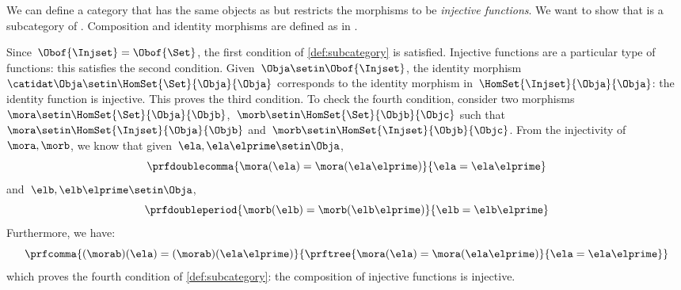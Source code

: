 \begin{example}
    \label{ex:Injset}
    We can define a category \Injset that has the same objects as \Set but restricts the morphisms to be \emph{injective functions}.
    We want to show that \Injset is a subcategory of \Set.
    Composition and identity morphisms are defined as in \Set.

    Since~$\Obof{\Injset}=\Obof{\Set}$, the first condition of \cref{def:subcategory} is satisfied.
    Injective functions are a particular type of functions: this satisfies the second condition.
    Given~$\Obja\setin \Obof{\Injset}$, the identity morphism~$\catidat\Obja\setin \HomSet{\Set}{\Obja}{\Obja}$ corresponds to the identity morphism in~$\HomSet{\Injset}{\Obja}{\Obja}$: the identity function is injective.
    This proves the third condition.
    To check the fourth condition, consider two morphisms~$\mora \setin \HomSet{\Set}{\Obja}{\Objb}$,~$\morb \setin \HomSet{\Set}{\Objb}{\Objc}$ such that~$\mora \setin \HomSet{\Injset}{\Obja}{\Objb}$ and~$\morb\setin \HomSet{\Injset}{\Objb}{\Objc}$.
    From the injectivity of~$\mora,\morb$, we know that given~$\ela,\ela\elprime\setin \Obja$,
    \begin{equation}
        \prfdoublecomma{
            \mora(\ela)=\mora(\ela\elprime)
        }{
            \ela=\ela\elprime
        }
    \end{equation}
    and~$\elb,\elb\elprime\setin \Obja$,
    \begin{equation}
        \prfdoubleperiod{
            \morb(\elb)=\morb(\elb\elprime)
        }{
            \elb=\elb\elprime
        }
    \end{equation}
    Furthermore, we have:
    \begin{equation}
        \prfcomma{
            (\morab)(\ela)
            =(\morab)(\ela\elprime)
        }{
            \prftree{
                \mora(\ela)=\mora(\ela\elprime)
            }{
                \ela=\ela\elprime
            }
        }
    \end{equation}
    which proves the fourth condition of \cref{def:subcategory}: the composition of injective functions is injective.
\end{example}

